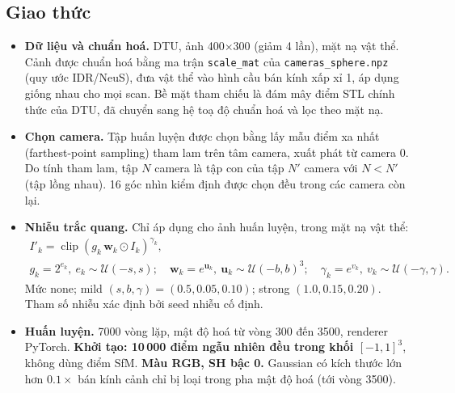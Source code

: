 \documentclass[11pt,a4paper]{article}
\begin{document}
\subsection{Giao thức}
\label{sec:protocol}
\begin{itemize}
  \item \textbf{Dữ liệu và chuẩn hoá.} DTU, ảnh 400$\times$300 (giảm 4 lần), mặt nạ vật thể. Cảnh được chuẩn hoá bằng ma trận \texttt{scale\_mat} của \texttt{cameras\_sphere.npz} (quy ước IDR/NeuS), đưa vật thể vào hình cầu bán kính xấp xỉ 1, áp dụng giống nhau cho mọi scan. Bề mặt tham chiếu là đám mây điểm STL chính thức của DTU, đã chuyển sang hệ toạ độ chuẩn hoá và lọc theo mặt nạ.
  \item \textbf{Chọn camera.} Tập huấn luyện được chọn bằng lấy mẫu điểm xa nhất (farthest-point sampling) tham lam trên tâm camera, xuất phát từ camera 0. Do tính tham lam, tập $N$ camera là tập con của tập $N'$ camera với $N<N'$ (tập lồng nhau). 16 góc nhìn kiểm định được chọn đều trong các camera còn lại.
  \item \textbf{Nhiễu trắc quang.} Chỉ áp dụng cho ảnh huấn luyện, trong mặt nạ vật thể:
  \begin{gather}
  I'_k = \operatorname{clip}(g_k\,\mathbf{w}_k \odot I_k)^{\gamma_k}, \\
  g_k = 2^{e_k},\ e_k\sim\mathcal{U}(-s,s);\quad
  \mathbf{w}_k = e^{\mathbf{u}_k},\ \mathbf{u}_k\sim\mathcal{U}(-b,b)^3;\quad
  \gamma_k = e^{v_k},\ v_k\sim\mathcal{U}(-\gamma,\gamma). \nonumber
  \end{gather}
  Mức none; mild $(s,b,\gamma)=(0.5,0.05,0.10)$; strong $(1.0,0.15,0.20)$. Tham số nhiễu xác định bởi seed nhiễu cố định.
  \item \textbf{Huấn luyện.} 7000 vòng lặp, mật độ hoá từ vòng 300 đến 3500, renderer PyTorch. \textbf{Khởi tạo: 10\,000 điểm ngẫu nhiên đều trong khối $[-1,1]^3$}, không dùng điểm SfM. \textbf{Màu RGB, SH bậc 0.} Gaussian có kích thước lớn hơn $0.1\times$ bán kính cảnh chỉ bị loại trong pha mật độ hoá (tới vòng 3500).
\end{itemize}
\end{document}
